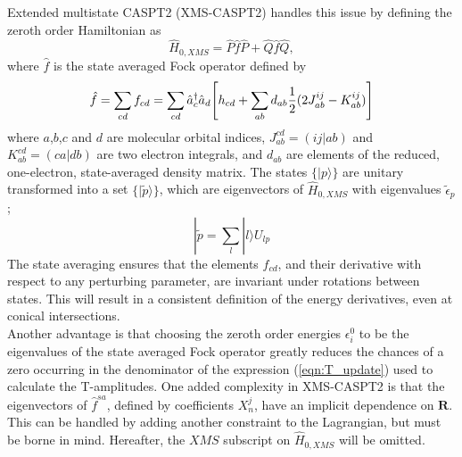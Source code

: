 \noindent Extended multistate CASPT2 (XMS-CASPT2) handles this issue by defining the zeroth order Hamiltonian as
\begin{equation}
\hat{H}_{0,XMS} = \hat{P}\hat{f}\hat{P} +  \hat{Q}\hat{f}\hat{Q},
\end{equation}
where $\hat{f}$ is the state averaged Fock operator defined by
\begin{equation}
\hat{f} = \sum_{cd}f_{cd} = \sum_{cd}
\hat{a}^{\dagger}_{c}\hat{a}_{d}
\Bigg{[} h_{cd} 
+ \sum_{ab}d_{ab}
\frac{1}{2}( 2J^{ij}_{ab}-K^{ij}_{ab})  \Bigg{]}
\end{equation}
where $a$,$b$,$c$ and $d$ are molecular orbital indices,
$J^{cd}_{ab} = (ij|ab)$ and $K^{cd}_{ab} = (ca|db)$ are two electron integrals, and $d_{ab}$ are elements of the reduced, one-electron,
state-averaged density matrix. The states $\{|p\rangle\}$ are unitary transformed into a set $\{|\tilde{p}\rangle\}$, 
which are eigenvectors of $\hat{H}_{0,XMS}$ with eigenvalues $\tilde{\epsilon}_{p}$;
\begin{equation}
|\tilde{p} = \sum_{l}|l\rangle U_{lp}
\end{equation}
The state averaging ensures that the elements $f_{cd}$, and their derivative with respect to any perturbing 
parameter, are invariant under rotations between states. This will result in a consistent definition of 
the energy derivatives, even at conical intersections.\\

\noindent Another advantage is that choosing the zeroth order energies $\epsilon^{0}_{i}$ 
to be the eigenvalues of the state averaged Fock operator greatly reduces the chances 
of a zero occurring in the denominator of the expression (\ref{eqn:T_update}) used to calculate 
the T-amplitudes. One added complexity in XMS-CASPT2 is that the eigenvectors of $\hat{f}^{sa}$, defined by coefficients $X_{n}^{j}$, 
have an implicit dependence on $\mathbf{R}$. This can be handled by adding another constraint to the Lagrangian,
but must be borne in mind. Hereafter, the $XMS$ subscript on $\hat{H}_{0,XMS}$ will be omitted.



